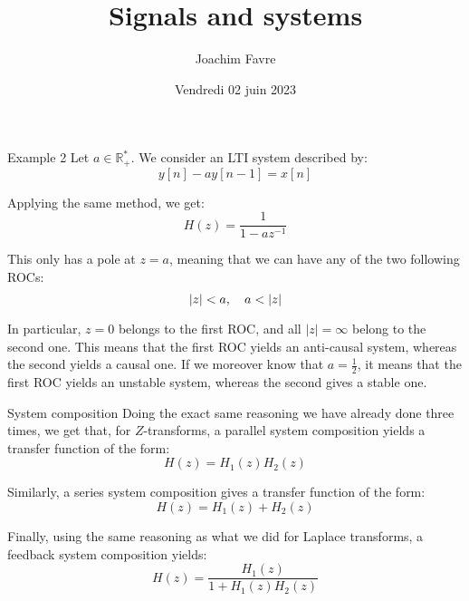 \documentclass[a4paper]{article}
\title{Signals and systems}
\author{Joachim Favre}
\date{Vendredi 02 juin 2023}
\begin{document}
\maketitle


\begin{parag}{Example 2}
    Let $a \in \mathbb{R}^*_+$. We consider an LTI system described by: 
    \[y\left[n\right] - ay\left[n-1\right] = x\left[n\right]\]
    
    Applying the same method, we get: 
    \[H\left(z\right) = \frac{1}{1 - az^{-1}}\]
    
    This only has a pole at $z = a$, meaning that we can have any of the two following ROCs: 
    \[\left|z\right| < a, \mathspace a < \left|z\right|\]
    
    In particular, $z = 0$ belongs to the first ROC, and all $\left|z\right| = \infty$ belong to the second one. This means that the first ROC yields an anti-causal system, whereas the second yields a causal one. If we moreover know that $a = \frac{1}{2}$, it means that the first ROC yields an unstable system, whereas the second gives a stable one.
\end{parag}

\begin{parag}{System composition}
    Doing the exact same reasoning we have already done three times, we get that, for $Z$-transforms, a parallel system composition yields a transfer function of the form: 
    \[H\left(z\right) = H_1\left(z\right) H_2\left(z\right)\]
    
    Similarly, a series system composition gives a transfer function of the form: 
    \[H\left(z\right) = H_1\left(z\right) + H_2\left(z\right)\]
    
    Finally, using the same reasoning as what we did for Laplace transforms, a feedback system composition yields: 
    \[H\left(z\right) = \frac{H_1\left(z\right)}{1 + H_1\left(z\right)H_2\left(z\right)}\]
\end{parag}
\end{document}
